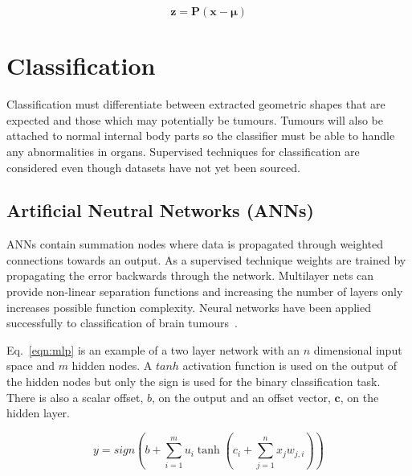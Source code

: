 \documentclass[journal]{IEEEtran}
\begin{document}
\begin{equation}
	\boldsymbol{z} = \boldsymbol{P}(\boldsymbol{x} - \boldsymbol{\mu})
	\label{eqn:PCA}
\end{equation}












\section{Classification}
\label{sec:class}

Classification must differentiate between extracted geometric shapes that are expected and those which may potentially be tumours.
Tumours will also be attached to normal internal body parts so the classifier must be able to handle any abnormalities in organs.
Supervised techniques for classification are considered even though datasets have not yet been sourced.



\subsection{Artificial Neutral Networks (ANNs)}
ANNs contain summation nodes where data is propagated through weighted connections towards an output. 
As a supervised technique weights are trained by propagating the error backwards through the network.
Multilayer nets can provide non-linear separation functions and increasing the number of layers only increases possible function complexity.
Neural networks have been applied successfully to classification of brain tumours~\cite{amin12brain}.

Eq.~\eqref{eqn:mlp} is an example of a two layer network with an $n$ dimensional input space and $m$ hidden nodes.
A $tanh$ activation function is used on the output of the hidden nodes but only the sign is used for the binary classification task.
There is also a scalar offset, $b$, on the output and an offset vector, $\mathbf{c}$, on the hidden layer. 

\begin{equation}
	y = sign \left(b + \sum_{i=1}^{m} u_i \tanh \left(c_i + \sum_{j=1}^{n} x_j w_{j,i}\right)  \right) 
	\label{eqn:mlp}
\end{equation}
\end{document}
